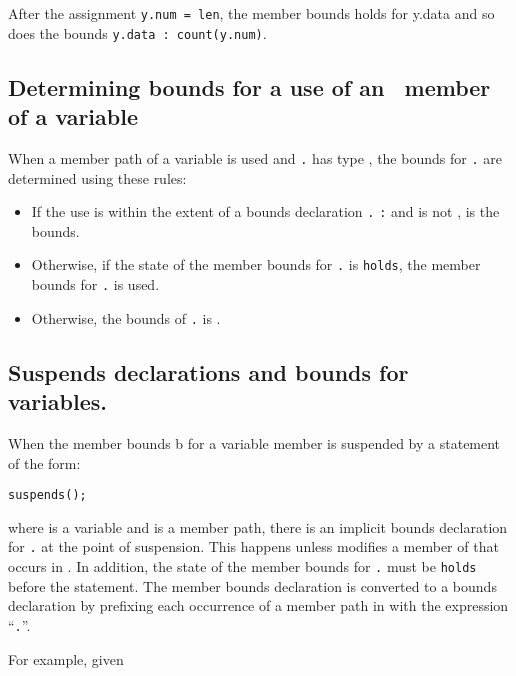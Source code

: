 After the assignment \texttt{y.num = len}, the member bounds holds for
y.data and so does the bounds \texttt{y.data : count(y.num)}.

\subsection{Determining bounds for a use of an \arrayptr\ member of a variable}
\label{section:determining-variable-member-bounds}

When a member path  of a variable  is used and
\texttt{.} has type \arrayptr, the bounds for
\texttt{.} are determined using these rules:

\begin{itemize}
\item
  If the use is within the extent of a bounds declaration
  \texttt{.} \texttt{:}  and
   is not \boundsnone,  is
  the bounds.
\item
  Otherwise, if the state of the member bounds for
  \texttt{.} is \texttt{holds}, the member bounds for
  \texttt{.} is used.
\item
  Otherwise, the bounds of \texttt{.} is
  \boundsnone.
\end{itemize}

\subsection{Suspends declarations and bounds for variables.}\label{suspends-declarations-and-bounds-for-variables.}

When the member bounds b for a variable member is suspended by a
statement of the form:

  \texttt{suspends(}\texttt{);}

where  is a variable and  is a member path, there is an
implicit bounds declaration for \texttt{.} at the point
of suspension. This happens unless  modifies a member 
of  that occurs in . In addition, the state of the
member bounds for \texttt{.} must be \texttt{holds}
before the statement. The member bounds declaration  is
converted to a bounds declaration by prefixing each occurrence of a
member path in  with the expression ``\texttt{.}''.

For example, given

